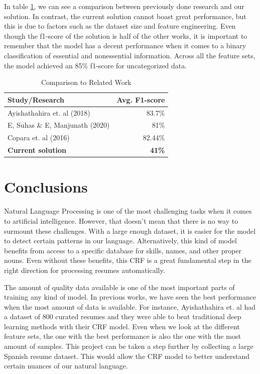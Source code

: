 \documentclass[a4paper, conference]{ieeeconf}
\begin{document}
  \medskip
  In table \ref{table:7}, we can see a comparison between previously done
  research and our solution. In contrast, the current solution cannot boast
  great performance, but this is due to factors such as the dataset size and
  feature engineering. Even though the f1-score of the solution is half of
  the other works, it is important to remember that the model has a decent
  performance when it comes to a binary classification of essential and
  nonessential information. Across all the feature sets, the model achieved an
  85\% f1-score for uncategorized data.
  \begin{table}[H]
    \centering
    \begin{tabular}{|l|r|}
         \hline
         \textbf{Study/Research} & \textbf{Avg. F1-score} \\
         \hline
             Ayishathahira et. al (2018) \cite{Ayishathahira2018a} & 83.7\% \\
             E, Suhas \& E, Manjunath (2020) \cite{E*2020} & 81\% \\
             Copara et. al (2016) \cite{Copara2016} & 82.44\% \\
         \hline
             \textbf{Current solution} & \textbf{41\%} \\
         \hline
    \end{tabular}
    \caption{Comparison to Related Work}
    \label{table:7}
  \end{table}

  \section{Conclusions}
  Natural Language Processing is one of the most challenging tasks when it
  comes to artificial intelligence. However, that doesn't mean that there is no
  way to surmount these challenges. With a large enough dataset, it is easier
  for the model to detect certain patterns in our language. Alternatively, this
  kind of model benefits from access to a specific database for skills, names,
  and other proper nouns. Even without these benefits, this CRF is a great
  fundamental step in the right direction for processing resumes automatically. 

  The amount of quality data available is one of the most important parts of
  training any kind of model. In previous works, we have seen the best
  performance when the most amount of data is available. For instance,
  Ayishathahira et. al \cite{Ayishathahira2018a} had a dataset of 800 curated
  resumes and they were able to beat traditional deep learning methods with
  their CRF model. Even when we look at the different feature sets, the one
  with the best performance is also the one with the most amount of samples.
  This project can be taken a step further by collecting a large Spanish resume
  dataset. This would allow the CRF model to better understand certain nuances
  of our natural language.
\end{document}

